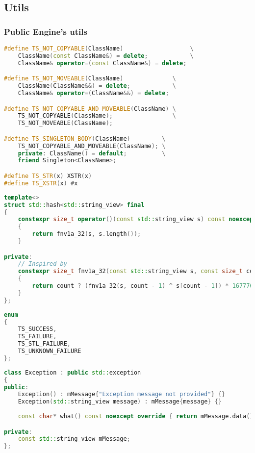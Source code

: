 \newpage
\subsection{Utils}
\subsubsection{Public Engine's utils}
\begin{lstlisting}[language=c++, caption=Macros of Public Engine utils(./engine/include/tsengine/utils.hpp)]
#define TS_NOT_COPYABLE(ClassName)                   \
    ClassName(const ClassName&) = delete;            \
    ClassName& operator=(const ClassName&) = delete;

#define TS_NOT_MOVEABLE(ClassName)              \
    ClassName(ClassName&&) = delete;            \
    ClassName& operator=(ClassName&&) = delete;

#define TS_NOT_COPYABLE_AND_MOVEABLE(ClassName) \
    TS_NOT_COPYABLE(ClassName);                 \
    TS_NOT_MOVEABLE(ClassName);

#define TS_SINGLETON_BODY(ClassName)         \
    TS_NOT_COPYABLE_AND_MOVEABLE(ClassName); \
    private: ClassName() = default;          \
    friend Singleton<ClassName>;

#define TS_STR(x) XSTR(x)
#define TS_XSTR(x) #x
\end{lstlisting}
\begin{lstlisting}[language=c++, caption=std::string\_view hash of Public Engine utils(./engine/include/tsengine/utils.hpp)]
template<>
struct std::hash<std::string_view> final
{
    constexpr size_t operator()(const std::string_view s) const noexcept
    {
        return fnv1a_32(s, s.length());
    }

private:
    // Inspired by
    constexpr size_t fnv1a_32(const std::string_view s, const size_t count) const noexcept
    {
        return count ? (fnv1a_32(s, count - 1) ^ s[count - 1]) * 16777619u : 2166136261u;
    }
};
\end{lstlisting}
\begin{lstlisting}[language=c++, caption=Return Codes of Public Engine's utils(./engine/include/tsengine/utils.hpp)]
enum
{
    TS_SUCCESS,
    TS_FAILURE,
    TS_STL_FAILURE,
    TS_UNKNOWN_FAILURE
};
\end{lstlisting}

\begin{lstlisting}[language=c++, caption=Exception of Public Engine's utils(./engine/include/tsengine/utils.hpp)]
class Exception : public std::exception
{
public:
    Exception() : mMessage{"Exception message not provided"} {}
    Exception(std::string_view message) : mMessage{message} {}
    
    const char* what() const noexcept override { return mMessage.data(); }

private:
    const std::string_view mMessage;
};
\end{lstlisting}

